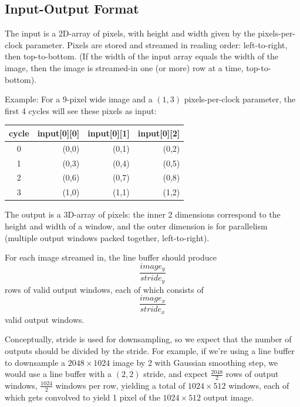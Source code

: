 \documentclass[12pt]{article}
\begin{document}
\subsection{Input-Output Format}

The input is a 2D-array of pixels, with height and width given by the
pixels-per-clock parameter. Pixels are stored and streamed in reading
order: left-to-right, then top-to-bottom. (If the width of the input
array equals the width of the image, then the image is streamed-in one
(or more) row at a time, top-to-bottom).

Example: For a 9-pixel wide image and a $(1,3)$ pixels-per-clock
parameter, the first 4 cycles will see these pixels as input:

\begin{center}
\begin{tabular}{c|r r r}
cycle & input[0][0] & input[0][1] & input[0][2] \\
\hline
0 & (0,0) & (0,1) & (0,2) \\
1 & (0,3) & (0,4) & (0,5) \\
2 & (0,6) & (0,7) & (0,8) \\
\hline
3 & (1,0) & (1,1) & (1,2)
\end{tabular}
\end{center}

The output is a 3D-array of pixels: the inner 2 dimensions correspond
to the height and width of a window, and the outer dimension is for
parallelism (multiple output windows packed together, left-to-right).

For each image streamed in, the line buffer should produce
\begin{equation}
\frac{image_y}{stride_y}
\end{equation}
rows of valid output windows, each of which consists of
\begin{equation}
\frac{image_x}{stride_x}
\end{equation}
valid output windows.

Conceptually, stride is used for downsampling, so we expect
that the number of outputs should be divided by the stride. For
example, if we're using a line buffer to downsample a
$2048\times 1024$ image by 2 with Gaussian smoothing step,
we would use a line buffer with a $(2,2)$ stride, and expect
$\frac{2048}{2}$ rows of output windows, $\frac{1024}{2}$ windows
per row, yielding a total of $1024\times 512$ windows,
each of which gets convolved to yield 1 pixel of the $1024 \times 512$
output image.
\end{document}
